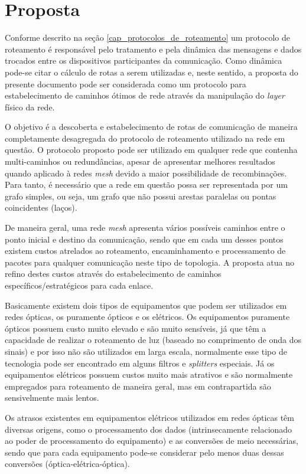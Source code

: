 \chapter{Proposta}
\label{capitulo_proposta}
Conforme descrito na seção \ref{cap_protocolos_de_roteamento} um protocolo de roteamento é responsável pelo tratamento e pela dinâmica das mensagens e dados trocados entre os dispositivos participantes da comunicação. Como dinâmica pode-se citar o cálculo de rotas a serem utilizadas e, neste sentido, a proposta do presente documento pode ser considerada como um protocolo para estabelecimento de caminhos ótimos de rede através da manipulação do \emph{layer} físico da rede.

O objetivo é a descoberta e estabelecimento de rotas de comunicação de maneira completamente desagregada do protocolo de roteamento utilizado na rede em questão. O protocolo proposto pode ser utilizado em qualquer rede que contenha multi-caminhos ou redundâncias, apesar de apresentar melhores resultados quando aplicado à redes \emph{mesh} devido a maior possibilidade de recombinações. Para tanto, é necessário que a rede em questão possa ser representada por um grafo simples, ou seja, um grafo que não possui arestas paralelas ou pontas coincidentes (laços).

De maneira geral, uma rede \emph{mesh} apresenta vários possíveis caminhos entre o ponto inicial e destino da comunicação, sendo que em cada um desses pontos existem custos atrelados ao roteamento, encaminhamento e processamento de pacotes para qualquer comunicação neste tipo de topologia. A proposta atua no refino destes custos através do estabelecimento de caminhos específicos/estratégicos para cada enlace.

Basicamente existem dois tipos de equipamentos que podem ser utilizados em redes ópticas, os puramente ópticos e os elétricos. Os equipamentos puramente ópticos possuem custo muito elevado e são muito sensíveis, já que têm a capacidade de realizar o roteamento de luz (baseado no comprimento de onda dos sinais) e por isso não são utilizados em larga escala, normalmente esse tipo de tecnologia pode ser encontrado em alguns filtros e \emph{splitters} especiais. Já os equipamentos elétricos possuem custos muito mais atrativos e são normalmente empregados para roteamento de maneira geral, mas em contrapartida são sensivelmente mais lentos.

Os atrasos existentes em equipamentos elétricos utilizados em redes ópticas têm diversas origens, como o processamento dos dados (intrinsecamente relacionado ao poder de processamento do equipamento) e as conversões de meio necessárias, sendo que para cada equipamento pode-se considerar pelo menos duas dessas conversões (óptica-elétrica-óptica). 

